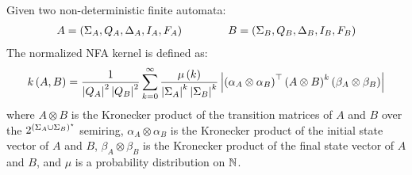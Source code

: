 \documentclass[12pt]{article}
\begin{document}
\begin{definition}
  Given two non-deterministic finite automata:
  \begin{align}
    A = \left(\Sigma_A, Q_A, \Delta_A, I_A, F_A\right)
    \qquad \qquad
    B = \left(\Sigma_B, Q_B, \Delta_B, I_B, F_B\right)
  \end{align}
  The normalized NFA kernel is defined as:
  \begin{align}
  k\left(A, B\right)
    = \frac{1}{\left\lvert Q_A\right\rvert^2 \left\lvert Q_B\right\rvert^2}
        \sum_{k = 0}^{\infty}
          \frac{\mu\left(k\right)}{\left\lvert\Sigma_A\right\rvert^k \left\lvert\Sigma_B\right\rvert^k}
          \left\lvert\left(\alpha_A \otimes \alpha_B\right)^\top
            \left(A \otimes B\right)^k
            \left(\beta_A \otimes \beta_B\right)\right\rvert
  \end{align}
  where
  \(A \otimes B\) is the Kronecker product of the transition matrices
  of \(A\) and \(B\) over the
  \(2^{\left(\Sigma_A \cup \Sigma_B\right)^\star}\) semiring,
  \(\alpha_A \otimes \alpha_B\) is the Kronecker product of the initial
  state vector of \(A\) and \(B\),
  \(\beta_A \otimes \beta_B\) is the Kronecker product of the final
  state vector of \(A\) and \(B\),
  and \(\mu\) is a probability distribution on \(\mathbb{N}\).
\end{definition}
\end{document}
